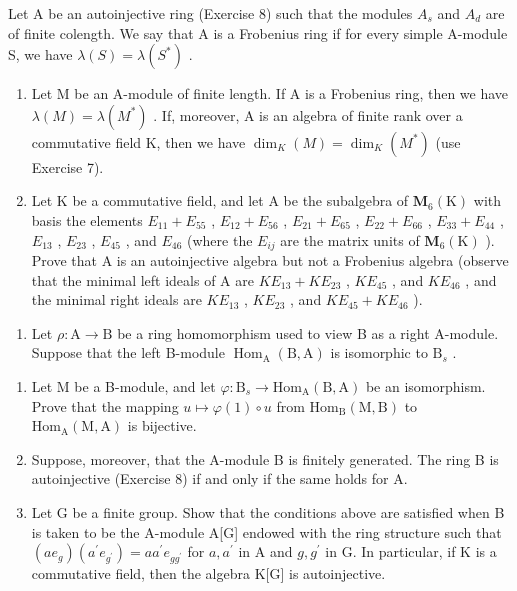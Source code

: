 Let A be an autoinjective ring (Exercise 8) such that the modules \(A_{s}\) and \(A_{d}\) are of finite colength. We say that A is a Frobenius ring if for every simple A-module S, we have \(\lambda(S) = \lambda(S^{*})\) .

\begin{enumerate}
\def\labelenumi{\alph{enumi})}
\item
  Let M be an A-module of finite length. If A is a Frobenius ring, then we have \(\lambda(M) = \lambda(M^{*})\) . If, moreover, A is an algebra of finite rank over a commutative field K, then we have \(\dim_K(M) = \dim_K(M^*)\) (use Exercise 7).
\item
  Let K be a commutative field, and let A be the subalgebra of \(\mathbf{M}_{6}(\mathrm{K})\) with basis the elements \(E_{11} + E_{55}\) , \(E_{12} + E_{56}\) , \(E_{21} + E_{65}\) , \(E_{22} + E_{66}\) , \(E_{33} + E_{44}\) , \(E_{13}\) , \(E_{23}\) , \(E_{45}\) , and \(E_{46}\) (where the \(E_{ij}\) are the matrix units of \(\mathbf{M}_{6}(\mathrm{K})\) ). Prove that A is an autoinjective algebra but not a Frobenius algebra (observe that the minimal left ideals of A are \(KE_{13} + KE_{23}\) , \(KE_{45}\) , and \(KE_{46}\) , and the minimal right ideals are \(KE_{13}\) , \(KE_{23}\) , and \(KE_{45} + KE_{46}\) ).
\end{enumerate}

\begin{enumerate}
\def\labelenumi{\arabic{enumi})}
\setcounter{enumi}{9}
\tightlist
\item
  Let \(\rho : \mathrm{A} \to \mathrm{B}\) be a ring homomorphism used to view B as a right A-module. Suppose that the left B-module \(\operatorname{Hom}_{\mathrm{A}}(\mathrm{B}, \mathrm{A})\) is isomorphic to \(\mathrm{B}_s\) .
\end{enumerate}

\begin{enumerate}
\def\labelenumi{\alph{enumi})}
\item
  Let M be a B-module, and let \(\varphi : \mathrm{B}_s \to \mathrm{Hom}_{\mathrm{A}}(\mathrm{B}, \mathrm{A})\) be an isomorphism. Prove that the mapping \(u \mapsto \varphi(1) \circ u\) from \(\mathrm{Hom}_{\mathrm{B}}(\mathrm{M}, \mathrm{B})\) to \(\mathrm{Hom}_{\mathrm{A}}(\mathrm{M}, \mathrm{A})\) is bijective.
\item
  Suppose, moreover, that the A-module B is finitely generated. The ring B is autoinjective (Exercise 8) if and only if the same holds for A.
\item
  Let G be a finite group. Show that the conditions above are satisfied when B is taken to be the A-module A{[}G{]} endowed with the ring structure such that \((ae_{g})(a^{\prime}e_{g^{\prime}})=aa^{\prime}e_{gg^{\prime}}\) for \(a,a^{\prime}\) in A and \(g,g^{\prime}\) in G. In particular, if K is a commutative field, then the algebra K{[}G{]} is autoinjective.
\end{enumerate}


